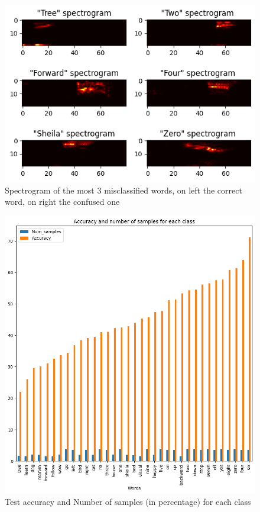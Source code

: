 \documentclass{class}
\begin{document}
\begin{figure}[H]
  \centering
  \includegraphics[width=.8\columnwidth]{images/misclassified_words.png}
  \caption{Spectrogram of the most 3 misclassified words, on left the correct word, on right the confused one}
  \label{fig-6}
\end{figure}

\begin{figure}[H]
  \centering
  \includegraphics[width=.7\columnwidth]{images/num_vs_accuracy.png}
  \caption{Test accuracy and Number of samples (in percentage) for each class}
  \label{fig-7}
\end{figure}
\end{document}
